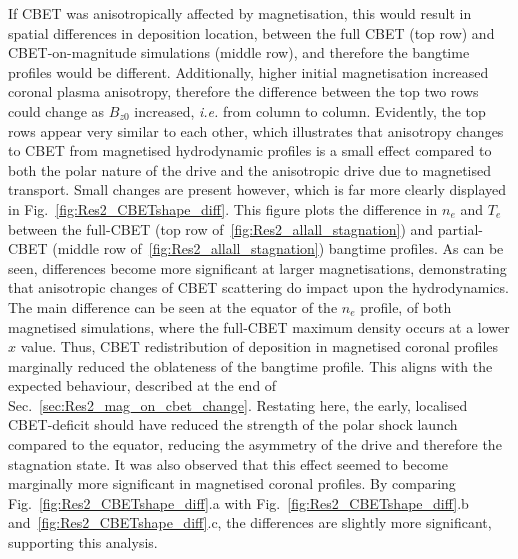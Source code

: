 If \ac{CBET} was anisotropically affected by magnetisation, this would result in spatial differences in deposition location, between the full \ac{CBET} (top row) and \ac{CBET}-on-magnitude simulations (middle row), and therefore the bangtime profiles would be different.
Additionally, higher initial magnetisation increased coronal plasma anisotropy, therefore the difference between the top two rows could change as $B_{z0}$ increased, \textit{i.e.} from column to column.
Evidently, the top rows appear very similar to each other, which illustrates that anisotropy changes to \ac{CBET} from magnetised hydrodynamic profiles is a small effect compared to both the polar nature of the drive and the anisotropic drive due to magnetised transport.
Small changes are present however, which is far more clearly displayed in Fig.~\ref{fig:Res2_CBETshape_diff}.
This figure plots the difference in $n_e$ and $T_e$ between the full-\ac{CBET} (top row of~\ref{fig:Res2_allall_stagnation}) and partial-\ac{CBET} (middle row of~\ref{fig:Res2_allall_stagnation}) bangtime profiles.
As can be seen, differences become more significant at larger magnetisations, demonstrating that anisotropic changes of \ac{CBET} scattering do impact upon the hydrodynamics.
The main difference can be seen at the equator of the $n_e$ profile, of both magnetised simulations, where the full-\ac{CBET} maximum density occurs at a lower $x$ value.
Thus, \ac{CBET} redistribution of deposition in magnetised coronal profiles marginally reduced the oblateness of the bangtime profile.
This aligns with the expected behaviour, described at the end of Sec.~\ref{sec:Res2_mag_on_cbet_change}.
Restating here, the early, localised \ac{CBET}-deficit should have reduced the strength of the polar shock launch compared to the equator, reducing the asymmetry of the drive and therefore the stagnation state.
It was also observed that this effect seemed to become marginally more significant in magnetised coronal profiles.
By comparing Fig.~\ref{fig:Res2_CBETshape_diff}.a with Fig.~\ref{fig:Res2_CBETshape_diff}.b and~\ref{fig:Res2_CBETshape_diff}.c, the differences are slightly more significant, supporting this analysis.

